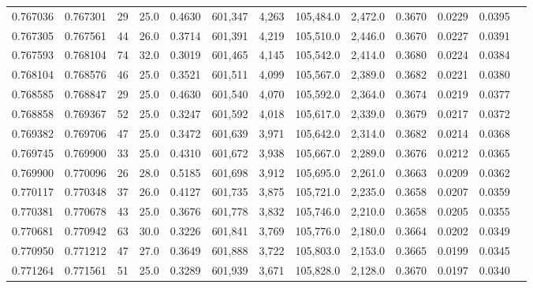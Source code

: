 \begin{tabular}{rrrrrrrrrrrrr}
0.767036 & 0.767301 &    29 & 25.0 &                                     0.4630 & 601,347 &   4,263 & 105,484.0 &   2,472.0 & 0.3670 & 0.0229 & 0.0395 \\
0.767305 & 0.767561 &    44 & 26.0 &                                     0.3714 & 601,391 &   4,219 & 105,510.0 &   2,446.0 & 0.3670 & 0.0227 & 0.0391 \\
0.767593 & 0.768104 &    74 & 32.0 &                                     0.3019 & 601,465 &   4,145 & 105,542.0 &   2,414.0 & 0.3680 & 0.0224 & 0.0384 \\
0.768104 & 0.768576 &    46 & 25.0 &                                     0.3521 & 601,511 &   4,099 & 105,567.0 &   2,389.0 & 0.3682 & 0.0221 & 0.0380 \\
0.768585 & 0.768847 &    29 & 25.0 &                                     0.4630 & 601,540 &   4,070 & 105,592.0 &   2,364.0 & 0.3674 & 0.0219 & 0.0377 \\
0.768858 & 0.769367 &    52 & 25.0 &                                     0.3247 & 601,592 &   4,018 & 105,617.0 &   2,339.0 & 0.3679 & 0.0217 & 0.0372 \\
0.769382 & 0.769706 &    47 & 25.0 &                                     0.3472 & 601,639 &   3,971 & 105,642.0 &   2,314.0 & 0.3682 & 0.0214 & 0.0368 \\
0.769745 & 0.769900 &    33 & 25.0 &                                     0.4310 & 601,672 &   3,938 & 105,667.0 &   2,289.0 & 0.3676 & 0.0212 & 0.0365 \\
0.769900 & 0.770096 &    26 & 28.0 &                                     0.5185 & 601,698 &   3,912 & 105,695.0 &   2,261.0 & 0.3663 & 0.0209 & 0.0362 \\
0.770117 & 0.770348 &    37 & 26.0 &                                     0.4127 & 601,735 &   3,875 & 105,721.0 &   2,235.0 & 0.3658 & 0.0207 & 0.0359 \\
0.770381 & 0.770678 &    43 & 25.0 &                                     0.3676 & 601,778 &   3,832 & 105,746.0 &   2,210.0 & 0.3658 & 0.0205 & 0.0355 \\
0.770681 & 0.770942 &    63 & 30.0 &                                     0.3226 & 601,841 &   3,769 & 105,776.0 &   2,180.0 & 0.3664 & 0.0202 & 0.0349 \\
0.770950 & 0.771212 &    47 & 27.0 &                                     0.3649 & 601,888 &   3,722 & 105,803.0 &   2,153.0 & 0.3665 & 0.0199 & 0.0345 \\
0.771264 & 0.771561 &    51 & 25.0 &                                     0.3289 & 601,939 &   3,671 & 105,828.0 &   2,128.0 & 0.3670 & 0.0197 & 0.0340 \\

\end{tabular}
